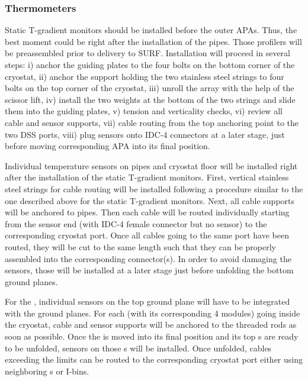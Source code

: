 \subsubsection{Thermometers}
\label{sec:fdgen-slow-cryo-instal-th}

Static T-gradient monitors should be installed before the outer APAs. Thus, the best moment could be right after the installation of the pipes. Those profilers will be preassembled prior to delivery to SURF. 
Installation will proceed in several steps:
i) anchor the guiding plates to the four bolts on the bottom corner of the cryostat,
ii) anchor the support holding the two stainless steel strings to four bolts on the top corner of the cryostat,
iii) unroll the array with the help of the scissor lift,
iv) install the two weights at the bottom of the two strings and slide them into the guiding plates, 
v) tension and verticality checks,
vi) review all cable and sensor supports, 
vii) cable routing from the top anchoring point to the two DSS ports, 
viii) plug sensors onto IDC-4 connectors at a later stage, just before moving corresponding APA into its final position. 

Individual temperature sensors on pipes and cryostat floor will be installed right after the installation of the static T-gradient monitors. First, vertical stainless steel strings for cable routing will be installed following a procedure similar to the one described above for the static T-gradient monitors. Next, all cable supports will be anchored to pipes. Then each cable will be routed individually starting from the sensor end (with IDC-4 female connector but no sensor)
to the corresponding cryostat port. Once all cables going to the same port have been routed, they will be cut to the same length such that they can be properly assembled into the corresponding connector(s). In order to avoid damaging the sensors, those will be installed at a later stage just before unfolding the bottom ground planes.

For the , individual sensors on the top ground plane will have to be integrated with the ground planes. For each  (with its corresponding 4  modules)
going inside the cryostat, cable and sensor supports will be anchored to the  threaded rods as soon as possible.
Once the  is moved into its final position and its top s are ready to be unfolded, sensors on those s will be installed. Once unfolded, cables 
exceeding the  limits can be routed to the corresponding cryostat port either using neighboring s or  I-bins. 


